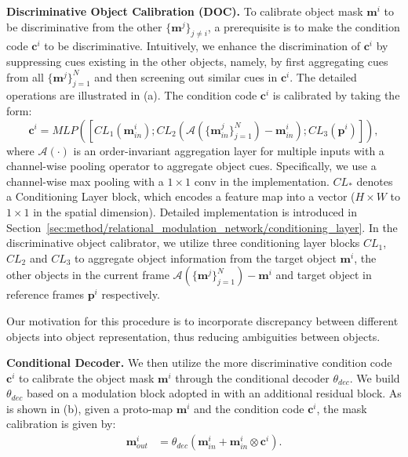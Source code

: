 \documentclass[sigconf]{acmart}
\begin{document}
\noindent\textbf{Discriminative Object Calibration (DOC).}
\label{sec:method/relational_modulation_network/inter_object_interaction}
To calibrate object mask $\mathbf{m}^i$ to be discriminative from the other $\{ \mathbf{m}^j\}_{j \neq i}$, a prerequisite is to make the condition code $\mathbf{c}^i$ to be discriminative.
Intuitively, we enhance the discrimination of $\mathbf{c}^i$ by suppressing cues existing in the other objects, namely, by first aggregating cues from all $\{ \mathbf{m}^j\}_{j =1}^N$ and then screening out similar cues in $\mathbf{c}^i$.
The detailed operations are illustrated in \fig{\ref{fig:multi-object-discrimination}} (a). The condition code $\mathbf{c}^i$ is calibrated by taking the form:
\begin{equation}
\mathbf{c}^{i}=MLP([CL_1(\mathbf{m}^{i}_{in}); CL_2(\mathcal{A}(\{\mathbf{m}^{j}_{in}\}_{j=1}^N)-\mathbf{m}^{i}_{in});CL_3(\mathbf{p}^{i})]),
\end{equation}
where $\mathcal{A}(\cdot)$ is an order-invariant aggregation layer for multiple inputs with a channel-wise pooling operator to aggregate object cues. Specifically, we use a channel-wise max pooling with a $1\times1$ conv in the implementation. $CL_{*}$ denotes a Conditioning Layer block, which encodes a feature map into a vector ($H\times W$ to $1 \times 1$ in the spatial dimension). Detailed implementation is introduced in Section~\ref{sec:method/relational_modulation_network/conditioning_layer}. In the discriminative object calibrator, we utilize three conditioning layer blocks $CL_1$, $CL_2$ and $CL_3$ to aggregate object information from the target object $\mathbf{m}^i$, the other objects in the current frame $\mathcal{A}(\{ \mathbf{m}^j\}_{j=1}^N)-\mathbf{m}^i$ and target object in reference frames $\mathbf{p}^i$ respectively.


Our motivation for this procedure is to incorporate discrepancy between different objects into object representation, thus reducing ambiguities between objects. 


\noindent\textbf{Conditional Decoder.}
\label{sec:method/relational_modulation_network/intra_object_interaction}
We then utilize the more discriminative condition code $\mathbf{c}^i$ to calibrate the object mask $\mathbf{m}^i$ through the conditional decoder $\theta_{dec}$.
We build $\theta_{dec}$ based on a modulation block adopted in \cite{yang2020collaborative,yang2020gated} with an additional residual block. 
As is shown in \fig{\ref{fig:multi-object-discrimination}} (b), given a proto-map $\mathbf{m}^{i}$ and the condition code $\mathbf{c}^{i}$, the mask calibration is given by:
\begin{align}
        \mathbf{m}^{i}_{out} & = \theta_{dec}( \mathbf{m}^{i}_{in} + \mathbf{m}^{i}_{in} \otimes \mathbf{c}^{i} ).
\end{align}        
\end{document}
